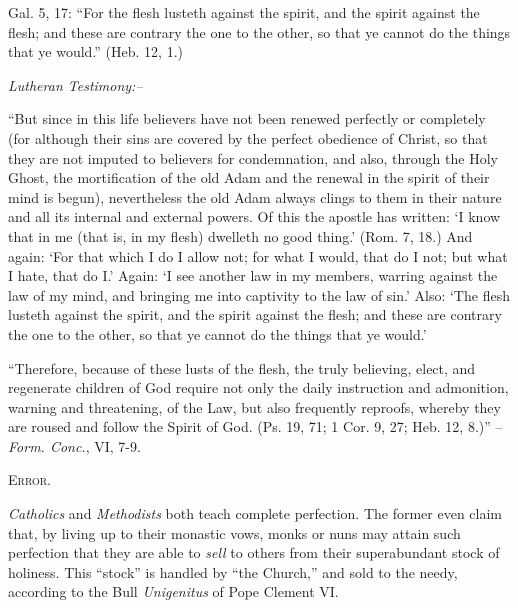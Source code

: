 \documentclass[
]{book}
\begin{document}
Gal. 5, 17: ``For the flesh lusteth against the spirit, and the spirit against the flesh; and these are contrary the one to the other, so that ye cannot do the things that ye would.'' (Heb. 12, 1.)

\begin{center}
\textsl{Lutheran Testimony:--}
\end{center}

``But since in this life believers have not been renewed perfectly or completely (for although their sins are covered by the perfect obedience of Christ, so that they are not imputed to believers for condemnation, and also, through the Holy Ghost, the mortification of the old Adam and the renewal in the spirit of their mind is begun), nevertheless the old Adam always clings to them in their nature and all its internal and external powers. Of this the apostle has written: `I know that in me (that is, in my flesh) dwelleth no good thing.' (Rom. 7, 18.) And again: `For that which I do I allow not; for what I would, that do I not; but what I hate, that do I.' Again: `I see another law in my members, warring against the law of my mind, and bringing me into captivity to the law of sin.' Also: `The flesh lusteth against the spirit, and the spirit against the flesh; and these are contrary the one to the other, so that ye cannot do the things that ye would.'

``Therefore, because of these lusts of the flesh, the truly believing, elect, and regenerate children of God require not only the daily instruction and admonition, warning and threatening, of the Law, but also frequently reproofs, whereby they are roused and follow the Spirit of God. (Ps. 19, 71; 1 Cor. 9, 27; Heb. 12, 8.)'' -- \emph{Form. Conc.}, VI, 7-9.

\begin{center}
\textsc{Error.}
\end{center}

\emph{Catholics} and \emph{Methodists} both teach complete perfection. The former even claim that, by living up to their monastic vows, monks or nuns may attain such perfection that they are able to \emph{sell} to others from their superabundant stock of holiness. This ``stock'' is handled by ``the Church,'' and sold to the needy, according to the Bull \emph{Unigenitus} of Pope Clement VI.
\end{document}
